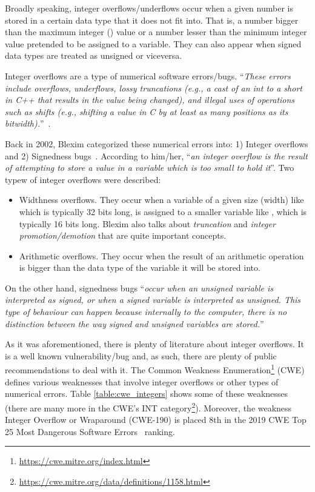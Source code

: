 Broadly speaking, integer overflows/underflows occur when a given number is stored in a certain data type that it does not fit into. That is, a number bigger than the maximum integer () value or a number lesser than the minimum integer value pretended to be assigned to a  variable. They can also appear when signed data types are treated as unsigned or viceversa. 

Integer overflows are a type of numerical software errors/bugs. ``\textit{These errors include
overflows, underflows, lossy truncations (e.g., a cast of an
int to a short in C++ that results in the value being
changed), and illegal uses of operations such as shifts (e.g.,
shifting a value in C by at least as many positions as its
bitwidth).}''~\cite{dietz2015understanding}.

Back in 2002, Blexim categorized these numerical errors into: 1) Integer overflows and 2) Signedness bugs~\cite{Blexim2002}. According to him/her, ``\textit{an integer overflow is the result of attempting to store a value in a variable which is too small to hold it}''. Two typew of integer overflows were described:
\begin{itemize}
	\item{Widthness overflows. They occur when a variable of a given size (width) like  which is typically 32 bits long, is assigned to a smaller variable like , which is typically 16 bits long. Blexim also talks about \textit{truncation} and \textit{integer promotion/demotion} that are quite important concepts. }
	\item{Arithmetic overflows. They occur when the result of an arithmetic operation is bigger than the data type of the variable it will be stored into.}
\end{itemize}

On the other hand, signedness bugs ``\textit{occur when an unsigned variable is interpreted as signed, or when a signed variable is interpreted as unsigned.  This type of behaviour can happen because internally to the computer, there is no distinction between the way signed and unsigned variables are stored.}''

As it was aforementioned, there is plenty of literature about integer overflows. It is a well known vulnerability/bug and, as such, there are plenty of public recommendations to deal with it. The Common Weakness Enumeration\footnote{\url{https://cwe.mitre.org/index.html}} (CWE)   defines various weaknesses that involve integer overflows or other types of numerical errors. Table \ref{table:cwe_integers} shows some of these weaknesses (there are many more in the CWE's INT category\footnote{\url{https://cwe.mitre.org/data/definitions/1158.html}}). Moreover, the weakness Integer Overflow or Wraparound (CWE-190) is placed 8th in the 2019 CWE Top 25 Most Dangerous Software Errors~\cite{Top25CWE2019} ranking.

